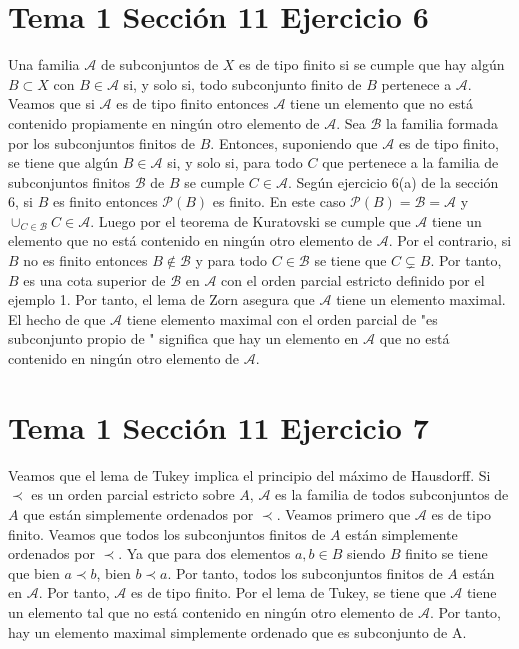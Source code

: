 \documentclass{article}
\begin{document}
\section{Tema 1 Sección 11 Ejercicio 6}
Una familia $\mathcal{A}$ de subconjuntos de $X$ es de tipo finito si se cumple que hay algún $B\subset X$ con $B\in \mathcal{A}$ si, y solo si, todo subconjunto finito de $B$ pertenece a $\mathcal{A}$. Veamos que si $\mathcal{A}$ es de tipo finito entonces $\mathcal{A}$ tiene un elemento que no está contenido propiamente en ningún otro elemento de $\mathcal{A}$. Sea $\mathcal{B}$ la familia formada por los subconjuntos finitos de $B$. Entonces, suponiendo que $\mathcal{A}$ es de tipo finito, se tiene que algún $B\in \mathcal{A}$ si, y solo si, para todo $C$ que pertenece a la familia de subconjuntos finitos $\mathcal{B}$ de $B$ se cumple $C\in\mathcal{A}$. Según ejercicio 6(a) de la sección 6, si $B$ es finito entonces $\mathcal{P}(B)$ es finito. En este caso $\mathcal{P}(B)=\mathcal{B}=\mathcal{A}$ y $\cup_{C\in\mathcal{B}}C\in\mathcal{A}$. Luego por el teorema de Kuratovski se cumple que $\mathcal{A}$ tiene un elemento que no está contenido en ningún otro elemento de $\mathcal{A}$. Por el contrario, si $B$ no es finito entonces $ B\notin \mathcal{B}$ y para todo $C\in \mathcal{B}$ se tiene que $C\subsetneq B$. Por tanto, $B$ es una cota superior de $\mathcal{B}$ en $\mathcal{A}$ con el orden parcial estricto definido por el ejemplo 1. Por tanto, el lema de Zorn asegura que $\mathcal{A}$ tiene un elemento maximal. El hecho de que $\mathcal{A}$ tiene elemento maximal con el orden parcial de "es subconjunto propio de " significa que hay un elemento en 
$\mathcal{A}$ que no está contenido en ningún otro elemento de $\mathcal{A}$.
\section{Tema 1 Sección 11 Ejercicio 7}
Veamos que el lema de Tukey implica el principio del máximo de Hausdorff. Si $\prec$ es un orden parcial estricto sobre $A$,  $\mathcal{A}$ es la familia de todos subconjuntos de $A$ que están simplemente ordenados por $\prec$. Veamos primero que $\mathcal{A}$ es de tipo finito. Veamos que todos los subconjuntos finitos de $A$ están simplemente ordenados por $\prec$. Ya que para dos elementos $a,b\in B$ siendo $B$ finito se tiene que  bien $a\prec b$, bien $b\prec a$. Por tanto, todos los subconjuntos finitos de $A$ están en $\mathcal{A}$. Por tanto, $\mathcal{A}$ es de tipo finito. Por el lema de Tukey, se tiene que  $\mathcal{A}$ tiene un elemento tal que no está contenido en ningún otro elemento de $\mathcal{A}$. Por tanto, hay un elemento maximal simplemente ordenado que es subconjunto de A.
\end{document}

